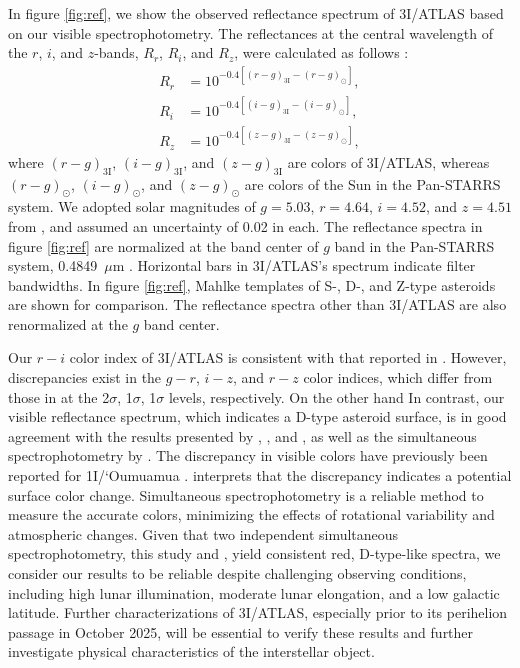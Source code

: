 \documentclass[]{pasj02}
\newcommand\I{3I/ATLAS\xspace}
\begin{document}
In figure \ref{fig:ref}, we show the observed reflectance spectrum of \I based on our visible spectrophotometry.
The reflectances at the central wavelength of the $r$, $i$, and $z$-bands, 
$R_r$, $R_i$, and $R_z$, were calculated as follows \citep[e.g.,][]{DeMeo2013}:
\begin{eqnarray}
    R_r &= 10^{-0.4[(r-g)_{\mathrm{3I}}-(r-g)_\odot]}, \\
    R_i &= 10^{-0.4[(i-g)_{\mathrm{3I}}-(i-g)_\odot]}, \\
    R_z &= 10^{-0.4[(z-g)_{\mathrm{3I}}-(z-g)_\odot]}, 
\end{eqnarray}
where 
$(r-g)_\mathrm{3I}$, $(i-g)_\mathrm{3I}$, and $(z-g)_\mathrm{3I}$ 
are colors of \I,
whereas
$(r-g)_\odot$, $(i-g)_\odot$, and $(z-g)_\odot$ 
are colors of the Sun in the Pan-STARRS system.
We adopted solar magnitudes of $g = 5.03$, $r = 4.64$, $i = 4.52$, and $z = 4.51$ from
\citet{Willmer2018}, and assumed an uncertainty of 0.02 in each.
The reflectance spectra in figure \ref{fig:ref} are normalized at the band center of $g$ band in the Pan-STARRS system, 0.4849~$\mu$m \citep{Willmer2018}.
Horizontal bars in \I's spectrum indicate filter bandwidths.
In figure \ref{fig:ref}, 
Mahlke templates of S-, D-, and Z-type asteroids \citep{Mahlke2022}
are shown for comparison.
The reflectance spectra other than \I are also renormalized at the $g$ band center.

Our $r-i$ color index of \I is consistent with that reported in \cite{Bolin2025_3I}.
However, discrepancies exist in the $g-r$, $i-z$, and $r-z$ color indices, which differ from those in \citet{Bolin2025_3I} 
at the 2$\sigma$, 1$\sigma$, 1$\sigma$ levels, respectively.
On the other hand
In contrast, our visible reflectance spectrum, which indicates a D-type asteroid surface, is in good agreement with the results presented by \citet{Seligman2025_3I}, \citet{Opitom2025_3I}, and \citet{Marcos2025_3I},
as well as the simultaneous spectrophotometry by \citet{Seligman2025_3I}.
The discrepancy in visible colors have previously been reported for 1I/`Oumuamua \citep{Meech2017, Jewitt2017, Bannister2017}.
\citet{Bannister2017} interprets that the discrepancy indicates a potential surface color change.
Simultaneous spectrophotometry is a reliable method to measure the accurate colors, minimizing the effects of rotational variability and atmospheric changes.
Given that two independent simultaneous spectrophotometry, this study and \citet{Seligman2025_3I}, yield consistent red, D-type-like spectra, 
we consider our results to be reliable despite challenging observing conditions, including high lunar illumination, moderate lunar elongation, and a low galactic latitude.
Further characterizations of 3I/ATLAS, especially prior to its perihelion passage in October 2025, will be essential to verify these results and further investigate physical characteristics of the interstellar object.
\end{document}
